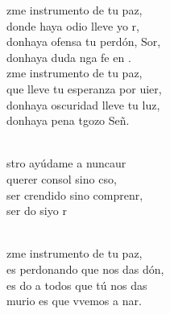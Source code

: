 \begin{cancion}%
	zme instrumento de tu paz,\\
	donde haya odio lleve yo r,\\
	donhaya ofensa tu perdón, Sor,\\
	donhaya duda nga fe en . \\
\jump
	zme instrumento de tu paz,\\
	que lleve tu esperanza por uier,\\
	donhaya oscuridad lleve tu luz,\\
	donhaya pena tgozo Señ. \\\jump\\
	\begin{chorus}%
	stro ayúdame a nuncaur\\
	querer  consol sino cso,\\
	ser crendido sino comprenr,\\
	ser do siyo r\\
	\end{chorus}%
	\jump\\
	zme instrumento de tu paz,\\
	es perdonando que nos das dón,\\
	es do a todos que tú nos das\\
	murio es que vvemos a nar.\\
\end{cancion}%
